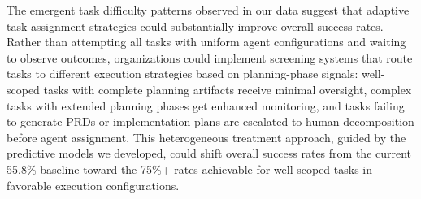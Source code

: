 \documentclass[]{article}
\begin{document}
The emergent task difficulty patterns observed in our data suggest that adaptive task assignment strategies could substantially improve overall success rates. Rather than attempting all tasks with uniform agent configurations and waiting to observe outcomes, organizations could implement screening systems that route tasks to different execution strategies based on planning-phase signals: well-scoped tasks with complete planning artifacts receive minimal oversight, complex tasks with extended planning phases get enhanced monitoring, and tasks failing to generate PRDs or implementation plans are escalated to human decomposition before agent assignment. This heterogeneous treatment approach, guided by the predictive models we developed, could shift overall success rates from the current 55.8\% baseline toward the 75\%+ rates achievable for well-scoped tasks in favorable execution configurations.

{}

\end{document}
